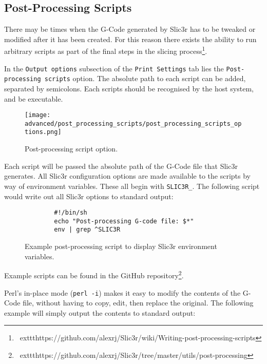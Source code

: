 
\subsection{Post-Processing Scripts} %
\label{sec:post_processing_scripts}

There may be times when the G-Code generated by Slic3r has to be tweaked or modified after it has been created.  For this reason there exists the ability to run arbitrary scripts as part of the final steps in the slicing process\footnote{\	exttt{https://github.com/alexrj/Slic3r/wiki/Writing-post-processing-scripts}}.

In the \texttt{Output options} subsection of the \texttt{Print Settings} tab lies the \texttt{Post-processing scripts} option.  The absolute path to each script can be added, separated by semicolons. Each scripts should be recognised by the host system, and be executable.

\begin{figure}[H]
\centering
\texttt{[image: advanced/post\_processing\_scripts/post\_processing\_scripts\_options.png]}
\caption{Post-processing script option.}
\label{fig:post_processing_scripts_options}
\end{figure}

Each script will be passed the absolute path of the G-Code file that Slic3r generates.  All Slic3r configuration options are made available to the scripts by way of environment variables.  These all begin with \texttt{SLIC3R\_}.  The following script would write out all Slic3r options to standard output:

\begin{figure}[H]
\small
\begin{verbatim}
        #!/bin/sh
        echo "Post-processing G-code file: $*"
        env | grep ^SLIC3R
\end{verbatim}
\caption{Example post-processing script to display Slic3r environment variables.}
\label{fig:exaple_post_processing_script_env_vars}
\end{figure}

Example scripts can be found in the GitHub repository\footnote{\	exttt{https://github.com/alexrj/Slic3r/tree/master/utils/post-processing}}.


Perl's in-place mode (\texttt{perl -i}) makes it easy to modify the contents of the G-Code file, without having to copy, edit, then replace the original.  The following example will simply output the contents to standard output:


